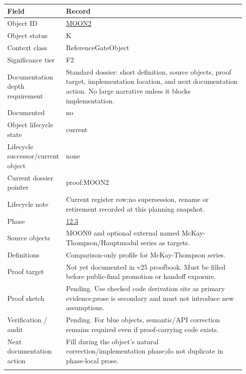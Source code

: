 \begin{longtable}{L{0.16\linewidth} L{0.81\linewidth}}
\hline
\textbf{Field} & \textbf{Record}\\
\hline
Object ID & \hyperlink{object-row-MOON2}{MOON2}\\
\hline\addlinespace[0.20em]
Object status & K\\
\hline\addlinespace[0.20em]
Context class & ReferenceGateObject\\
\hline\addlinespace[0.20em]
Significance tier & F2\\
\hline\addlinespace[0.20em]
Documentation depth requirement & Standard dossier: short definition, source objects, proof target, implementation location, and next documentation action. No large narrative unless it blocks implementation.\\
\hline\addlinespace[0.20em]
Documented & no\\
\hline\addlinespace[0.20em]
Object lifecycle state & current\\
\hline\addlinespace[0.20em]
Lifecycle successor/\allowbreak{}current object & none\\
\hline\addlinespace[0.20em]
Current dossier pointer & proof:MOON2\\
\hline\addlinespace[0.20em]
Lifecycle note & Current register row;\newline no supersession, rename or retirement recorded at this planning snapshot.\\
\hline\addlinespace[0.20em]
Phase & \hyperlink{phase-row-12-3}{12.3}\\
\hline\addlinespace[0.20em]
Source objects & MOON0 and optional external named McKay-Thompson/\allowbreak{}Hauptmodul series as targets.\\
\hline\addlinespace[0.20em]
Definitions & Comparison-only profile for McKay-Thompson series.\\
\hline\addlinespace[0.20em]
Proof target & Not yet documented in v25 proofbook. Must be filled before public-final promotion or handoff exposure.\\
\hline\addlinespace[0.20em]
Proof sketch & Pending. Use checked code derivation site as primary evidence;\newline prose is secondary and must not introduce new assumptions.\\
\hline\addlinespace[0.20em]
Verification /\allowbreak{} audit & Pending. For blue objects, semantic/\allowbreak{}API correction remains required even if proof-carrying code exists.\\
\hline\addlinespace[0.20em]
Next documentation action & Fill during the object's natural correction/\allowbreak{}implementation phase;\newline do not duplicate in phase-local prose.\\
\hline\addlinespace[0.20em]
\end{longtable}
